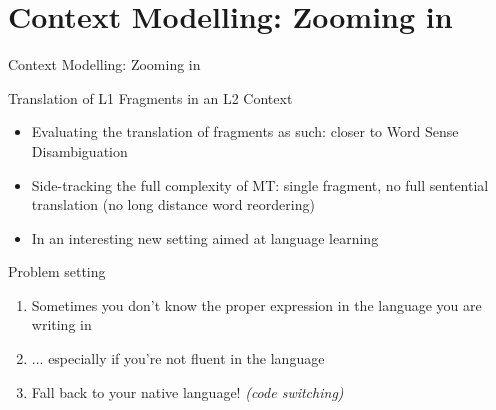 \documentclass[compress]{beamer}
\begin{document}
\section{Context Modelling: Zooming in}


\begin{frame}{Context Modelling: Zooming in}

  \begin{block}{Translation of L1 Fragments in an L2 Context}
    \begin{itemize}
      \item Evaluating the translation of fragments as such: closer to Word
        Sense Disambiguation
      \item Side-tracking the full complexity of MT: single fragment,  no full sentential
        translation (no long distance word reordering)
      \item In an interesting new setting aimed at language learning
    \end{itemize}
  \end{block}


  \begin{block}{Problem setting}
    \begin{enumerate}[<+->]
      \item Sometimes you don't know the proper expression in the language you
      are writing in
      \item ... especially if you're not fluent in the language
      \item Fall back to your native language! \emph{(code switching)}
    \end{enumerate}
  \end{block}

\end{frame}
\end{document}
